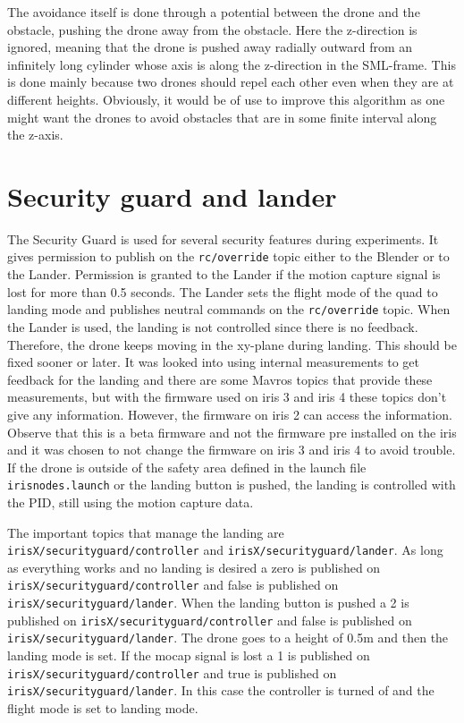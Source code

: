 \documentclass[titlepage,11pt,a4paper]{article}
\begin{document}
The avoidance itself is done through a potential between the drone and
the obstacle, pushing the drone away from the obstacle. Here the
z-direction is ignored, meaning that the drone is pushed away radially
outward from an infinitely long cylinder whose axis is along the
z-direction in the SML-frame. This is done mainly because two drones
should repel each other even when they are at different
heights. Obviously, it would be of use to improve this algorithm as
one might want the drones to avoid obstacles that are in some finite
interval along the z-axis.


\section{Security guard and lander}
\label{sec:security_guard}

The Security Guard is used for several security features during
experiments. It gives permission to publish on the
\texttt{rc/override} topic either to the Blender or to the
Lander. Permission is granted to the Lander if the motion capture
signal is lost for more than 0.5 seconds. The Lander sets the flight
mode of the quad to landing mode and publishes neutral commands on the
\texttt{rc/override} topic. When the Lander is used, the landing is not
controlled since there is no feedback. Therefore, the drone keeps
moving in the xy-plane during landing. This should be fixed sooner or
later. It was looked into using internal measurements to get feedback
for the landing and there are some Mavros topics that provide these
measurements, but with the firmware used on iris 3 and iris 4 these
topics don't give any information. However, the firmware on iris 2 can
access the information. Observe that this is a beta firmware and not
the firmware pre installed on the iris and it was chosen to not change
the firmware on iris 3 and iris 4 to avoid trouble. If the drone is
outside of the safety area defined in the launch file
\texttt{iris\textunderscore nodes.launch} or the landing button is
pushed, the landing is controlled with the PID, still using the motion
capture data.

The important topics that manage the landing are
\texttt{irisX/security\textunderscore guard/controller} and
\texttt{irisX/security\textunderscore guard/lander}. As long as
everything works and no landing is desired a zero is published on
\texttt{irisX/security\textunderscore guard/controller} and false is
published on \texttt{irisX/security\textunderscore guard/lander}. When
the landing button is pushed a 2 is published on
\texttt{irisX/security\textunderscore guard/controller} and false is
published on \texttt{irisX/security\textunderscore guard/lander}. The
drone goes to a height of 0.5m and then the landing mode is set. If
the mocap signal is lost a 1 is published on
\texttt{irisX/security\textunderscore guard/controller} and true is
published on \texttt{irisX/security\textunderscore guard/lander}. In
this case the controller is turned of and the flight mode is set to
landing mode.
\end{document}
